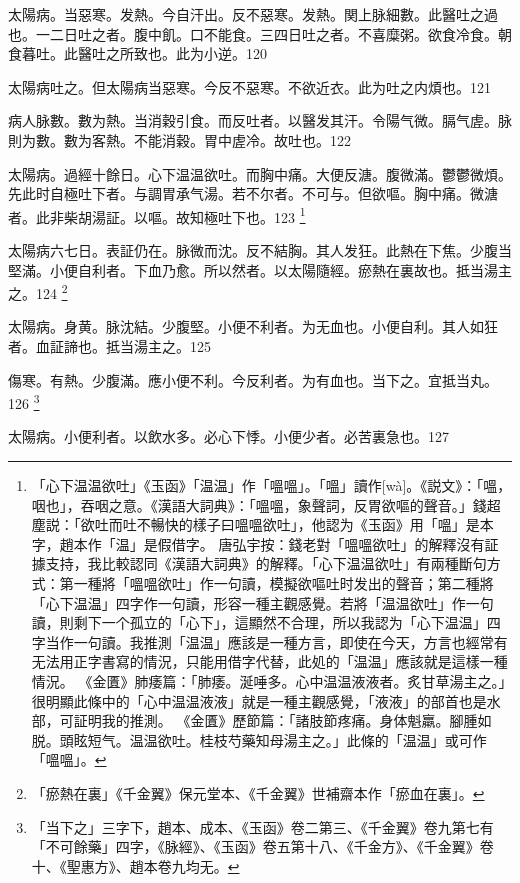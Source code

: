 太陽病。当惡寒。发熱。今自汗出。反不惡寒。发熱。関上脉細數。此醫吐之過也。一二日吐之者。腹中飢。口不能食。三四日吐之者。不喜糜粥。欲食冷食。朝食暮吐。此醫吐之所致也。此为小逆。120

太陽病吐之。但太陽病当惡寒。今反不惡寒。不欲近衣。此为吐之内煩也。121

病人脉數。數为熱。当消穀引食。而反吐者。以醫发其汗。令陽气微。膈气虗。脉則为數。數为客熱。不能消穀。胃中虗冷。故吐也。122

太陽病。過經十餘日。心下温温欲吐。而胸中痛。大便反溏。腹微滿。鬱鬱微煩。先{\khaai 此}时自極吐下者。与{\khaai 調胃}承气湯。若不尔者。不可与。但欲嘔。胸中痛。微溏者。此非柴胡湯証。以嘔。故知極吐下也。123
	\footnote{
		「心下温温欲吐」《玉函》「温温」作「嗢嗢」。「嗢」讀作[wà]。《説文》：「嗢，咽也」，吞咽之意。《漢語大詞典》：「嗢嗢，象聲詞，反胃欲嘔的聲音。」錢超塵説：「欲吐而吐不暢快的樣子曰嗢嗢欲吐」，他認为《玉函》用「嗢」是本字，趙本作「温」是假借字。
		唐弘宇按：錢老對「嗢嗢欲吐」的解釋沒有証據支持，我比較認同《漢語大詞典》的解釋。「心下温温欲吐」有兩種斷句方式：第一種將「嗢嗢欲吐」作一句讀，模擬欲嘔吐时发出的聲音；第二種將「心下温温」四字作一句讀，形容一種主觀感覺。若將「温温欲吐」作一句讀，則剩下一个孤立的「心下」，這顯然不合理，所以我認为「心下温温」四字当作一句讀。我推測「温温」應該是一種方言，即使在今天，方言也經常有无法用正字書寫的情況，只能用借字代替，此処的「温温」應該就是這樣一種情況。
		《金匱》肺痿篇：「肺痿。涎唾多。心中温温液液者。炙甘草湯主之。」很明顯此條中的「心中温温液液」就是一種主觀感覺，「液液」的部首也是水部，可証明我的推測。
		《金匱》歷節篇：「諸肢節疼痛。身体魁羸。腳腫如脱。頭眩短气。温温欲吐。桂枝芍藥知母湯主之。」此條的「温温」或可作「嗢嗢」。
	}

太陽病六七日。表証仍在。脉微而沈。反不結胸。其人发狂。此熱在下焦。少腹当堅滿。小便自利者。下血乃愈。所以然者。以太陽隨經。瘀熱在裏故也。抵当湯主之。124
	\footnote{
		「瘀熱在裏」《千金翼》保元堂本、《千金翼》世補齋本作「瘀血在裏」。
	}

太陽病。身黄。脉沈結。少腹堅。小便不利者。为无血也。小便自利。其人如狂者。血証諦也。抵当湯主之。125

傷寒。有熱。少腹滿。應小便不利。今反利者。为有血也。当下之。宜抵当丸。126
	\footnote{
		「当下之」三字下，趙本、成本、《玉函》卷二第三、《千金翼》卷九第七有「不可餘藥」四字，《脉經》、《玉函》卷五第十八、《千金方》、《千金翼》卷十、《聖惠方》、趙本卷九均无。
	}

太陽病。小便利者。以飲水多。必心下悸。小便少者。必苦裏急也。127

